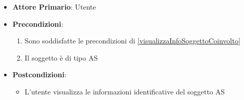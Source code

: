 \begin{itemize}
    \item \textbf{Attore Primario}: Utente

    \item \textbf{Precondizioni}:
    \begin{enumerate}
        \item Sono soddisfatte le precondizioni di \ref{visualizzaInfoSoggettoCoinvolto}
        \item Il soggetto è di tipo AS
    \end{enumerate}

    \item \textbf{Postcondizioni}:
    \begin{itemize}
        \item L'utente visualizza le informazioni identificative del soggetto AS
    \end{itemize}


\end{itemize}
